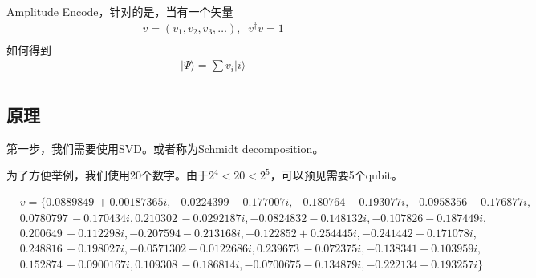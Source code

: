 Amplitude Encode，针对的是，当有一个矢量
\begin{equation}
\begin{split}
&v=\left(v_1,v_2,v_3,\ldots\right),\;\; v^{\dagger}v=1\\
\end{split}
\end{equation}
如何得到
\begin{equation}
\begin{split}
&| \Psi \rangle = \sum v_i |i\rangle \\
\end{split}
\end{equation}

\subsection{\label{sec:AESVD}原理}

第一步，我们需要使用SVD。或者称为Schmidt decomposition。

为了方便举例，我们使用20个数字。由于$2^4 < 20 < 2^5$，可以预见需要5个qubit。


\begin{equation}
\begin{split}
&v=\{0.0889849\, +0.00187365 i,-0.0224399-0.177007 i,-0.180764-0.193077 i,-0.0958356-0.176877 i,\\
&0.0780797\, -0.170434 i, 0.210302\, -0.0292187 i,-0.0824832-0.148132 i,-0.107826-0.187449 i, \\
&0.200649\, -0.112298 i, -0.207594-0.213168 i,-0.122852+0.254445 i,-0.241442+0.171078 i,\\
&0.248816\, +0.198027 i,-0.0571302-0.0122686 i,0.239673\, -0.072375 i,-0.138341-0.103959 i,\\
&0.152874\, +0.0900167 i,0.109308\, -0.186814 i,-0.0700675-0.134879 i,-0.222134+0.193257 i\}\\
\end{split}
\end{equation}


